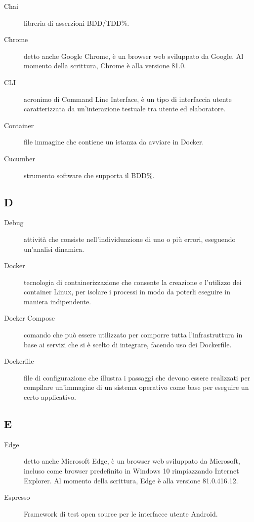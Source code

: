 \documentclass[../manuale-manutentore.tex]{subfiles}
\begin{document}
\begin{description}
    \item[Chai] libreria di asserzioni BDD/TDD\%.
    \item[Chrome] detto anche Google Chrome, è un browser web sviluppato da Google. Al momento della scrittura, Chrome è alla versione 81.0.
    \item[CLI] acronimo di Command Line Interface, è un tipo di interfaccia utente caratterizzata da un'interazione testuale tra utente ed elaboratore.
    \item[Container] file immagine che contiene un istanza da avviare in Docker.
    \item[Cucumber] strumento software che supporta il BDD\%.
\end{description}

\subsection{D}

\begin{description}
    \item[Debug] attività che consiste nell'individuazione di uno o più errori, eseguendo un'analisi dinamica.
    \item[Docker] tecnologia di containerizzazione che consente la creazione e l'utilizzo dei container Linux, per isolare i processi in modo da poterli eseguire in maniera indipendente.
    \item[Docker Compose] comando che può essere utilizzato per comporre tutta l'infrastruttura in base ai servizi che si è scelto di integrare, facendo uso dei Dockerfile.
    \item[Dockerfile] file di configurazione che illustra i passaggi che devono essere realizzati per compilare un'immagine di un sistema operativo come base per eseguire un certo applicativo.
\end{description}

\subsection{E}

\begin{description}
  \item[Edge] detto anche Microsoft Edge, è un browser web sviluppato da Microsoft, incluso come browser predefinito in Windows 10 rimpiazzando Internet Explorer. Al momento della scrittura, Edge è alla versione 81.0.416.12.
  \item[Espresso] Framework di test open source per le interfacce utente Android.
\end{description}
\end{document}
